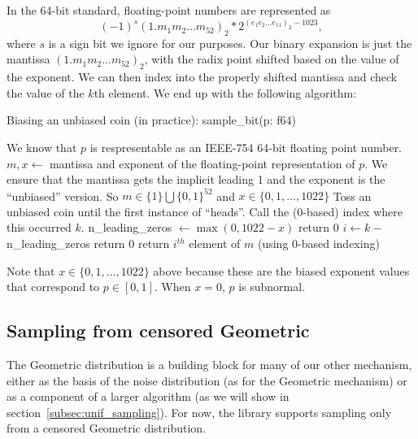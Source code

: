 \documentclass[11pt]{scrartcl} %
\begin{document}
In the 64-bit standard, floating-point numbers are represented as
\[ (-1)^s(1.m_1m_2 \hdots m_{52})_2 * 2^{(e_{1}e_2 \hdots e_{11})_2 - 1023}, \]
where $s$ is a sign bit we ignore for our purposes.
Our binary expansion is just the mantissa $(1.m_1m_2 \hdots m_{52})_2$, with
the radix point shifted based on the value of the exponent.
We can then index into the properly shifted mantissa and check the value of the $k$th element.
We end up with the following algorithm:
\begin{algorithm}[H]
	\caption{Biasing an unbiased coin (in practice): \newline sample\_bit(p: f64)}
	\label{alg:biasing_a_coin_practice}
	\begin{algorithmic}[1]
		\State We know that $p$ is respresentable as an IEEE-754 64-bit floating point number.
		\State $m, x \gets $ mantissa and exponent of the floating-point representation of $p$. 
		We ensure that the mantissa gets the implicit leading 1 and the exponent is the ``unbiased'' version.
		So $m \in \{1\} \bigcup \{0, 1\}^{52}$ and $x \in \{0, 1, \hdots, 1022\}$
		\State Toss an unbiased coin until the first instance of ``heads''. Call the (0-based) index where this occurred $k$.
		\State n\_leading\_zeros $\gets \max(0, 1022 - x)$
			\State return 0
		\Else
			\State $i \gets k -$ n\_leading\_zeros 
				\State return 0
			\Else
				\State return $i^{th}$ element of $m$ (using 0-based indexing)
			\EndIf
		\EndIf
	\end{algorithmic}
\end{algorithm}
Note that $x \in \{0, 1, \hdots, 1022\}$ above because these are the biased exponent values that correspond to $p \in [0,1]$.
When $x=0$, $p$ is subnormal.

\subsection{Sampling from censored Geometric}
The Geometric distribution is a building block for many of our other mechanism, either as the basis of the 
noise distribution (as for the Geometric mechanism) or as a component of a larger algorithm (as we will show in 
section~\ref{subsec:unif_sampling}). For now, the library supports sampling only from a censored Geometric distribution. \newline 
\end{document}
